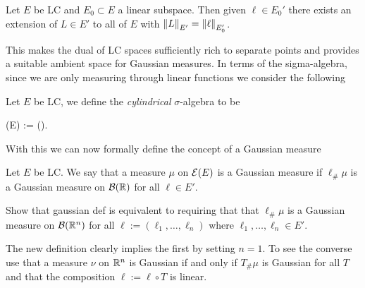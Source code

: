 \documentclass[
    a4paper,
    DIV=14,
    abstract=true,
    numbers=noenddot
]{scrartcl}
\begin{document}
\begin{theorem}
    Let $E$ be LC and $E_0 \subset E$  a linear subspace. Then given $ \ell \in E_0'$ there exists an extension of $L \in E'$ to all of $E$ with $\left\lVert L \right\rVert_{E'}=\left\lVert \ell \right\rVert_{E_0'}$.
\end{theorem}
This makes the dual of LC spaces  sufficiently rich to separate points and provides a suitable ambient space for Gaussian measures. In terms of the sigma-algebra, since we are only measuring through linear functions we consider the following
\begin{definition}
    Let $E$ be LC, we define the \emph{cylindrical} $\sigma$-algebra to be 
    \begin{aligneq*}
        \Ee(E) := \sigma(). 
    \end{aligneq*}     
\end{definition}
With this we can now formally define the concept of a Gaussian measure
\begin{definition}\label{GM def}
    Let $E$ be LC. We say that a measure $\mu$ on $\mathcal{E}(E)$ is a Gaussian measure if $\ell _{\#}\mu$ is a Gaussian measure on $\mathcal{B}(\mathbb{R})$ for all $\ell \in E'$.
\end{definition} 
\begin{exercise}
    Show that gaussian def is equivalent to requiring that that $\bm{\ell }_{\#}\mu$ is a Gaussian measure on $\mathcal{B}(\mathbb{R}^n)$ for all $\bm{\ell }:=(\ell_1,\ldots, \ell _n )$ where $\ell _1,\ldots, \ell _n \in E'$.
    \exerciseSymbol
\end{exercise}
\begin{hint}
The new definition clearly implies the first by setting $n=1$. To see the converse use that a measure $\nu$ on $\mathbb{R}^n$ is Gaussian if and only if $T_{\#}\mu$ is Gaussian for all $T$ and that the composition $\ell :=\bm{\ell }\circ T$ is linear.
\end{hint}
\end{document}
